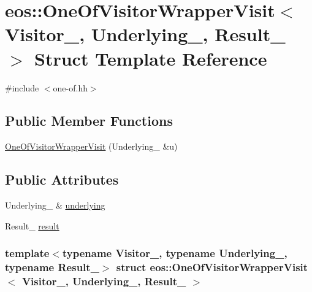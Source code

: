 \hypertarget{structeos_1_1OneOfVisitorWrapperVisit_3_01Visitor___00_01Underlying___00_01Result___01_4}{
\section{eos::OneOfVisitorWrapperVisit$<$ Visitor\_\-, Underlying\_\-, Result\_\- $>$ Struct Template Reference}
\label{structeos_1_1OneOfVisitorWrapperVisit_3_01Visitor___00_01Underlying___00_01Result___01_4}
}


{\ttfamily \#include $<$one-\/of.hh$>$}\subsection*{Public Member Functions}
\begin{DoxyCompactItemize}
\item 
\hyperlink{structeos_1_1OneOfVisitorWrapperVisit_3_01Visitor___00_01Underlying___00_01Result___01_4_a568f043401c51749bbdd08a5eab78f1f}{OneOfVisitorWrapperVisit} (Underlying\_\- \&u)
\end{DoxyCompactItemize}
\subsection*{Public Attributes}
\begin{DoxyCompactItemize}
\item 
Underlying\_\- \& \hyperlink{structeos_1_1OneOfVisitorWrapperVisit_3_01Visitor___00_01Underlying___00_01Result___01_4_a1fd69aa2e4d584295d72379aba12b4a4}{underlying}
\item 
Result\_\- \hyperlink{structeos_1_1OneOfVisitorWrapperVisit_3_01Visitor___00_01Underlying___00_01Result___01_4_a478622f2291199e57fd1685945ce5933}{result}
\end{DoxyCompactItemize}
\subsubsection*{template$<$typename Visitor\_\-, typename Underlying\_\-, typename Result\_\-$>$ struct eos::OneOfVisitorWrapperVisit$<$ Visitor\_\-, Underlying\_\-, Result\_\- $>$}




